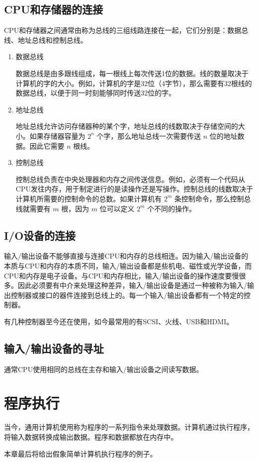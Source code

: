 \subsection{CPU和存储器的连接}
CPU和存储器之间通常由称为总线的三组线路连接在一起，它们分别是：数据总线、地址总线和控制总线。
\begin{enumerate}
	\item 数据总线

	数据总线是由多跟线组成，每一根线上每次传送1位的数据。线的数量取决于计算机的字的大小。例如，计算机的字是32位（4字节），那么需要有32根线的数据总线，以便于同一时刻能够同时传送32位的字。
	\item 地址总线

	地址总线允许访问存储器种的某个字，地址总线的线数取决于存储空间的大小。如果存储器容量为
	$2^n$
	个字，那么地址总线一次需要传送
	$n$
	位的地址数据。因此它需要
	$n$
	根线。
	\item 控制总线

	控制总线负责在中央处理器和内存之间传送信息。例如，必须有一个代码从CPU发往内存，用于制定进行的是读操作还是写操作。控制总线的线数取决于计算机所需要的控制命令的总数。如果计算机有
	$2^m$
	条控制命令，那么控制总线就需要有
	$m$
	根，因为
	$m$
	位可以定义
	$2^m$
	个不同的操作。
\end{enumerate}
\subsection{I/O设备的连接}
输入/输出设备不能够直接与连接CPU和内存的总线相连。因为输入/输出设备的本质与CPU和内存的本质不同，输入/输出设备都是些机电、磁性或光学设备，而CPU和内存是电子设备。与CPU和内存相比，输入/输出设备的操作速度要慢很多。因此必须要有中介来处理这种差异，输入/输出设备是通过一种被称为输入/输出控制器或接口的器件连接到总线上的。每一个输入/输出设备都有一个特定的控制器。

有几种控制器至今还在使用，如今最常用的有SCSI、火线、USB和HDMI。
\subsection{输入/输出设备的寻址}
通常CPU使用相同的总线在主存和输入/输出设备之间读写数据。
\section{程序执行}
当今，通用计算机使用称为程序的一系列指令来处理数据。计算机通过执行程序，将输入数据转换成输出数据。程序和数据都放在内存中。

本章最后将给出假象简单计算机执行程序的例子。
